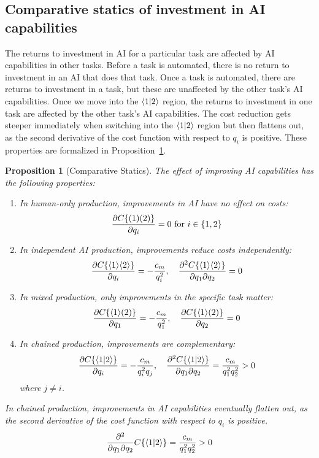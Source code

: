 \documentclass{article}
\newtheorem{proposition}[theorem]{Proposition}
\begin{document}
\subsection{Comparative statics of investment in AI capabilities}
The returns to investment in AI for a particular task are affected by AI capabilities in other tasks.
Before a task is automated, there is no return to investment in an AI that does that task.
Once a task is automated, there are returns to investment in a task, but these are unaffected by the other task's AI capabilities.
Once we move into the $\langle 1|2 \rangle$ region, the returns to investment in one task are affected by the other task's AI capabilities.
The cost reduction gets steeper immediately when switching into the $\langle 1|2 \rangle$ region but then flattens out, as the second derivative of the cost function with respect to $q_i$ is positive.
These properties are formalized in Proposition~\ref{prop:comparative_statics}.

\begin{proposition}[Comparative Statics] \label{prop:comparative_statics}
  The effect of improving AI capabilities has the following properties:
  \begin{enumerate}
  \item In human-only production, improvements in AI have no effect on costs:
  \[\frac{\partial C\{ ( 1 )( 2 ) \}}{\partial q_i} = 0 \text{ for } i \in \{1,2\}\]
  \item In independent AI production, improvements reduce costs independently:
  \[\frac{\partial C\{ \langle 1 \rangle\langle 2 \rangle \}}{\partial q_i} = -\frac{c_m}{q_i^2}, \quad \frac{\partial^2 C\{ \langle 1 \rangle\langle 2 \rangle \}}{\partial q_1 \partial q_2} = 0\]
  \item In mixed production, only improvements in the specific task matter:
  \[\frac{\partial C\{ \langle 1 \rangle( 2 ) \}}{\partial q_1} = -\frac{c_m}{q_1^2}, \quad \frac{\partial C\{ \langle 1 \rangle( 2 ) \}}{\partial q_2} = 0\]
  \item In chained production, improvements are complementary:
  \[\frac{\partial C\{ \langle 1|2 \rangle \}}{\partial q_i} = -\frac{c_m}{q_i^2q_j}, \quad \frac{\partial^2 C\{ \langle 1|2 \rangle \}}{\partial q_1 \partial q_2} = \frac{c_m}{q_1^2q_2^2} > 0\]
  where $j \neq i$.
  \end{enumerate}

  In chained production, improvements in AI capabilities eventually flatten out, as the second derivative of the cost function with respect to $q_i$ is positive.
  \begin{equation}
      \frac{\partial^2}{\partial q_1 \partial q_2} C\{ \langle 1|2 \rangle \} = \frac{c_m}{q_1^2q_2^2} > 0
  \end{equation}

\end{proposition}
 
\end{document}
